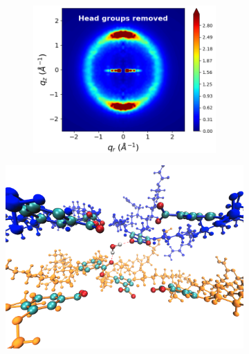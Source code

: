 \documentclass[journal=jpcbfk,manusciprt=article]{achemso}
\begin{document}
  \begin{figure}[!htb]
  \begin{subfigure}{0.45\textwidth}
  \centering
  \begin{subfigure}{\textwidth}
  \includegraphics[width=\textwidth]{nophenyls_rzplot.png}
  \end{subfigure}
  \caption{}\label{fig:rdouble_nophenyls}
  \end{subfigure}
  \begin{subfigure}{0.45\textwidth}
  \centering
  \includegraphics[width=\textwidth]{hbonds_tails.png}

\end{subfigure}
\end{figure}
\end{document}
